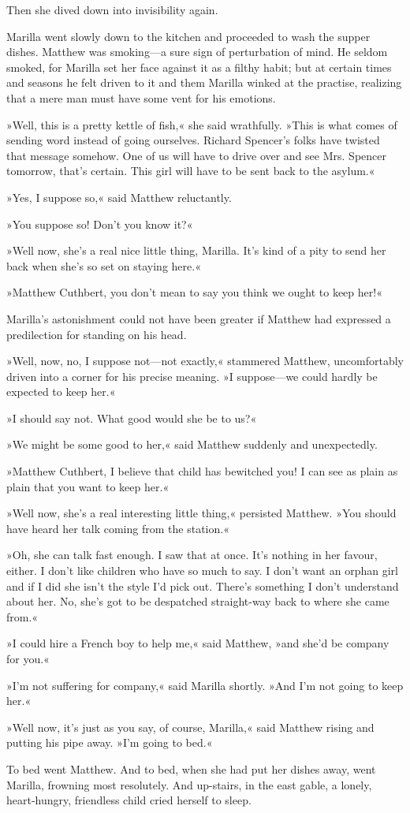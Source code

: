 Then she dived down into invisibility again.

Marilla went slowly down to the kitchen and proceeded to wash the supper dishes. Matthew was smoking—a sure sign of perturbation of mind. He seldom smoked, for Marilla set her face against it as a filthy habit; but at certain times and seasons he felt driven to it and them Marilla winked at the practise, realizing that a mere man must have some vent for his emotions.

»Well, this is a pretty kettle of fish,« she said wrathfully. »This is what comes of sending word instead of going ourselves. Richard Spencer’s folks have twisted that message somehow. One of us will have to drive over and see Mrs. Spencer tomorrow, that’s certain. This girl will have to be sent back to the asylum.«

»Yes, I suppose so,« said Matthew reluctantly.

»You suppose so! Don’t you know it?«

»Well now, she’s a real nice little thing, Marilla. It’s kind of a pity to send her back when she’s so set on staying here.«

»Matthew Cuthbert, you don’t mean to say you think we ought to keep her!«

Marilla’s astonishment could not have been greater if Matthew had expressed a predilection for standing on his head.

»Well, now, no, I suppose not—not exactly,« stammered Matthew, uncomfortably driven into a corner for his precise meaning. »I suppose—we could hardly be expected to keep her.«

»I should say not. What good would she be to us?«

»We might be some good to her,« said Matthew suddenly and unexpectedly.

»Matthew Cuthbert, I believe that child has bewitched you! I can see as plain as plain that you want to keep her.«

»Well now, she’s a real interesting little thing,« persisted Matthew. »You should have heard her talk coming from the station.«

»Oh, she can talk fast enough. I saw that at once. It’s nothing in her favour, either. I don’t like children who have so much to say. I don’t want an orphan girl and if I did she isn’t the style I’d pick out. There’s something I don’t understand about her. No, she’s got to be despatched straight-way back to where she came from.«

»I could hire a French boy to help me,« said Matthew, »and she’d be company for you.«

»I’m not suffering for company,« said Marilla shortly. »And I’m not going to keep her.«

»Well now, it’s just as you say, of course, Marilla,« said Matthew rising and putting his pipe away. »I’m going to bed.«

To bed went Matthew. And to bed, when she had put her dishes away, went Marilla, frowning most resolutely. And up-stairs, in the east gable, a lonely, heart-hungry, friendless child cried herself to sleep.

